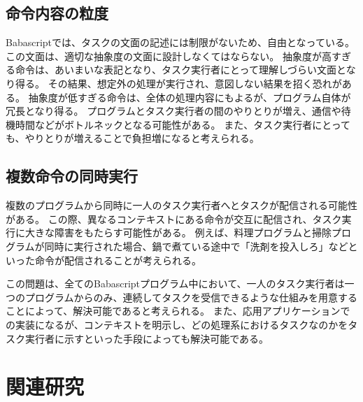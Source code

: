 \subsection{命令内容の粒度}\label{ux547dux4ee4ux5185ux5bb9ux306eux7c92ux5ea6}

Babascriptでは、タスクの文面の記述には制限がないため、自由となっている。
この文面は、適切な抽象度の文面に設計しなくてはならない。
抽象度が高すぎる命令は、あいまいな表記となり、タスク実行者にとって理解しづらい文面となり得る。
その結果、想定外の処理が実行され、意図しない結果を招く恐れがある。
抽象度が低すぎる命令は、全体の処理内容にもよるが、プログラム自体が冗長となり得る。
プログラムとタスク実行者の間のやりとりが増え、通信や待機時間などがボトルネックとなる可能性がある。
また、タスク実行者にとっても、やりとりが増えることで負担増になると考えられる。

\subsection{複数命令の同時実行}\label{ux8907ux6570ux547dux4ee4ux306eux540cux6642ux5b9fux884c}

複数のプログラムから同時に一人のタスク実行者へとタスクが配信される可能性がある。
この際、異なるコンテキストにある命令が交互に配信され、タスク実行に大きな障害をもたらす可能性がある。
例えば、料理プログラムと掃除プログラムが同時に実行された場合、鍋で煮ている途中で「洗剤を投入しろ」などといった命令が配信されることが考えられる。

この問題は、全てのBabascriptプログラム中において、一人のタスク実行者は一つのプログラムからのみ、連続してタスクを受信できるような仕組みを用意することによって、解決可能であると考えられる。
また、応用アプリケーションでの実装になるが、コンテキストを明示し、どの処理系におけるタスクなのかをタスク実行者に示すといった手段によっても解決可能である。

\section{関連研究}\label{ux95a2ux9023ux7814ux7a76}

